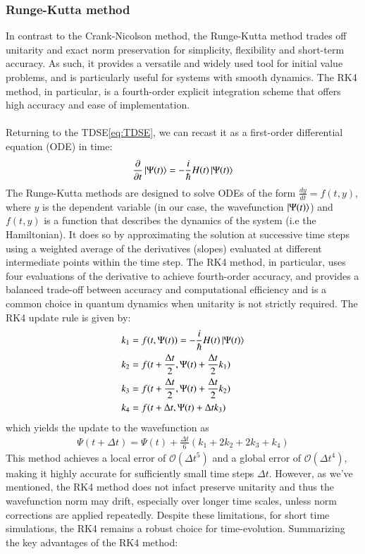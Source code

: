 \documentclass{subfiles}
\begin{document}
\subsubsection{Runge-Kutta method}
In contrast to the Crank-Nicolson method, the Runge-Kutta method trades off unitarity and exact norm preservation for simplicity, flexibility and short-term accuracy. As such, it provides a versatile and widely used tool for initial value problems, and is particularly useful for systems with smooth dynamics. The RK4 method, in particular, is a fourth-order explicit integration scheme that offers high accuracy and ease of implementation.
\\\\
Returning to the TDSE\eqref{eq:TDSE}, we can recast it as a first-order differential equation (ODE) in time:
\begin{align*}
    \frac{\partial}{\partial t}\ket{\Psi(t)} = -\frac{i}{\hbar}H(t)\ket{\Psi(t)}
\end{align*}
The Runge-Kutta methods are designed to solve ODEs of the form $\frac{dy}{dt} = f(t, y)$, where $y$ is the dependent variable (in our case, the wavefunction $\ket{\Psi(t)}$) and $f(t, y)$ is a function that describes the dynamics of the system (i.e the Hamiltonian). It does so by approximating the solution at successive time steps using a weighted average of the derivatives (slopes) evaluated at different intermediate points within the time step. The RK4 method, in particular, uses four evaluations of the derivative to achieve fourth-order accuracy, and provides a balanced trade-off between accuracy and computational efficiency and is a common choice in quantum dynamics when unitarity is not strictly required. The RK4 update rule is given by:
\begin{align*}
    k_1 &= f(t, \Psi(t)) = -\frac{i}{\hbar}H(t)\ket{\Psi(t)} \\
    k_2 &= f(t + \frac{\Delta t}{2}, \Psi(t) + \frac{\Delta t}{2}k_1) \\
    k_3 &= f(t + \frac{\Delta t}{2}, \Psi(t) + \frac{\Delta t}{2}k_2) \\
    k_4 &= f(t + \Delta t, \Psi(t) + \Delta t k_3)
\end{align*}
which yields the update to the wavefunction as
\begin{align*}
    \Psi(t + \Delta t) = \Psi(t) + \frac{\Delta t}{6}(k_1 + 2k_2 + 2k_3 + k_4)
\end{align*}
This method achieves a local error of $\mathcal{O}(\Delta t^5)$ and a global error of $\mathcal{O}(\Delta t^4)$, making it highly accurate for sufficiently small time steps $\Delta t$. However, as we've mentioned, the RK4 method does not infact preserve unitarity and thus the wavefunction norm may drift, especially over longer time scales, unless norm corrections are applied repeatedly. Despite these limitations, for short time simulations, the RK4 remains a robust choice for time-evolution. Summarizing the key advantages of the RK4 method:
\end{document}
